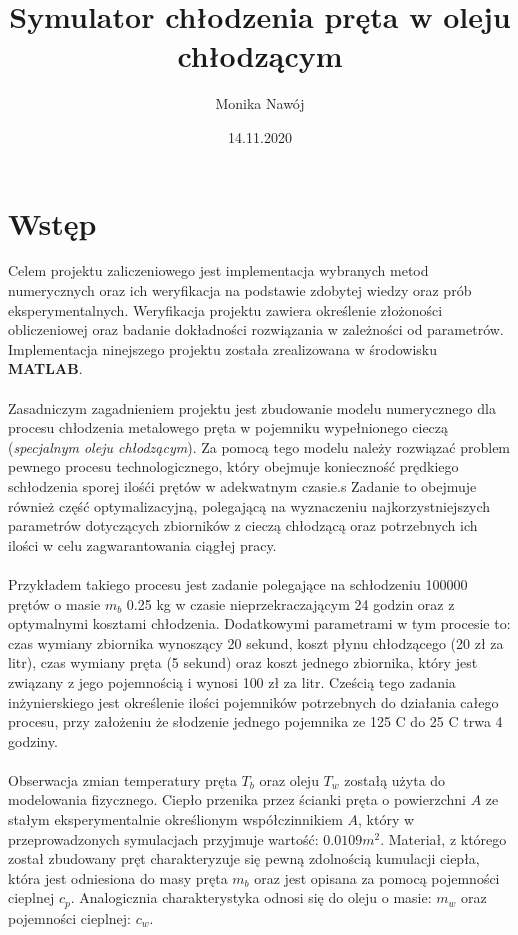 \documentclass[
	12pt, %
]{fphw}
\title{Symulator chłodzenia pręta w oleju chłodzącym} %
\author{Monika Nawój} %
\date{14.11.2020} %
\institute{Politechnika Warszawska \\ Wydział Elektryczny} %
\begin{document}
\maketitle %


\section{Wstęp}
Celem projektu zaliczeniowego jest implementacja wybranych metod numerycznych
oraz ich weryfikacja na podstawie zdobytej wiedzy oraz prób eksperymentalnych.
Weryfikacja projektu zawiera określenie złożoności obliczeniowej oraz badanie
dokładności rozwiązania w zależności od parametrów.
Implementacja ninejszego projektu została zrealizowana w środowisku \textbf{MATLAB}.
\\
\\
Zasadniczym zagadnieniem projektu jest zbudowanie modelu numerycznego dla procesu chłodzenia
metalowego pręta w pojemniku wypełnionego cieczą (\textit{specjalnym oleju chłodzącym}).
Za pomocą tego modelu należy rozwiązać problem pewnego procesu technologicznego,
który obejmuje konieczność prędkiego schłodzenia sporej ilośći prętów w adekwatnym czasie.s
Zadanie to obejmuje również część optymalizacyjną, polegającą na wyznaczeniu
najkorzystniejszych parametrów dotyczących zbiorników z cieczą chłodzącą
oraz potrzebnych ich ilości w celu zagwarantowania ciągłej pracy.
\\
\\
Przykładem takiego procesu jest zadanie polegające na schłodzeniu 100000 prętów o masie \( m_b \) 0.25 kg
w czasie nieprzekraczającym 24 godzin oraz z optymalnymi kosztami chłodzenia.
Dodatkowymi parametrami w tym procesie to: czas wymiany zbiornika wynoszący 20 sekund,
koszt płynu chłodzącego (20 zł za litr), czas wymiany pręta (5 sekund) oraz koszt jednego zbiornika,
który jest związany z jego pojemnością i wynosi 100 zł za litr.
Cześcią tego zadania inżynierskiego jest określenie ilości pojemników potrzebnych
do działania całego procesu, przy założeniu że słodzenie jednego pojemnika ze 125 \textdegree{}C do 25 \textdegree{}C
trwa 4 godziny.
\\
\\
Obserwacja zmian temperatury pręta \( T_b \) oraz oleju \( T_w \) zostałą użyta do modelowania
fizycznego. Ciepło przenika przez ścianki pręta o powierzchni \( A \) ze stałym eksperymentalnie
określionym współczinnikiem \( A \), który w przeprowadzonych symulacjach przyjmuje wartość: \(0.0109 m^2\).
Materiał, z którego został zbudowany pręt charakteryzuje się pewną zdolnością kumulacji ciepła,
która jest odniesiona do masy pręta \( m_b \) oraz jest opisana za pomocą pojemności cieplnej \( c_p \).
Analogicznia charakterystyka odnosi się do oleju o masie: \( m_w \) oraz pojemności cieplnej: \( c_w \).
\end{document}
